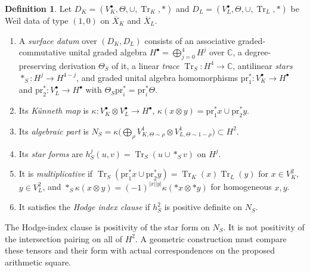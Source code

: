 \documentclass[11pt]{amsart}
\theoremstyle{plain}
\theoremstyle{definition}
\newtheorem{definition}[theorem]{Definition}
\theoremstyle{remark}
\numberwithin{equation}{section}
\newcommand{\C}{\mathbb{C}}
\newcommand{\Xbar}{\overline{X}}
\DeclareMathOperator{\Tr}{Tr}
\begin{document}
\begin{definition}\label{def:surface-datum}
Let $D_K=(V_K^\bullet,\Theta,\cup,\Tr_K,*)$ and
$D_L=(V_L^\bullet,\Theta,\cup,\Tr_L,*)$ be Weil data of type $(1,0)$ on
$\Xbar_K$ and $\Xbar_L$.
\begin{enumerate}[label=(\alph*)]
\item A \emph{surface datum} over $(D_K,D_L)$ consists of an associative
  graded-commutative unital graded algebra $H^\bullet=\bigoplus_{j=0}^4
  H^j$ over $\C$, a degree-preserving derivation $\Theta_S$ of it, a
  linear \emph{trace} $\Tr_S:H^4\to\C$, antilinear \emph{stars}
  $*_S:H^j\to H^{4-j}$, and graded unital algebra homomorphisms
  $\mathrm{pr}_1^*:V_K^\bullet\to H^\bullet$ and
  $\mathrm{pr}_2^*:V_L^\bullet\to H^\bullet$ with
  $\Theta_S\mathrm{pr}_i^*=\mathrm{pr}_i^*\Theta$.
\item Its \emph{K\"unneth map} is $\kappa:V_K^\bullet\otimes
  V_L^\bullet\to H^\bullet$, $\kappa(x\otimes y)=\mathrm{pr}_1^*x\cup
  \mathrm{pr}_2^*y$.
\item Its \emph{algebraic part} is $N_S=\kappa\bigl(\bigoplus_\rho
  V^1_{K,\Theta\sim\rho}\otimes V^1_{L,\Theta\sim1-\rho}\bigr)\subset
  H^2$.
\item Its \emph{star forms} are $h_S^j(u,v)=\Tr_S(u\cup*_Sv)$ on $H^j$.
\item It is \emph{multiplicative} if
  $\Tr_S(\mathrm{pr}_1^*x\cup\mathrm{pr}_2^*y)=\Tr_K(x)\Tr_L(y)$ for
  $x\in V_K^2$, $y\in V_L^2$, and
  $*_S\kappa(x\otimes y)=(-1)^{|x||y|}\kappa(*x\otimes*y)$ for
  homogeneous $x,y$.
\item It satisfies the \emph{Hodge index clause} if $h_S^2$ is positive
  definite on $N_S$.
\end{enumerate}
\end{definition}

The Hodge-index clause is positivity of the star form on $N_S$.
It is not positivity of the intersection pairing on all of $H^2$.
A geometric construction must compare these tensors and their form
with actual correspondences on the proposed arithmetic square.
\end{document}
